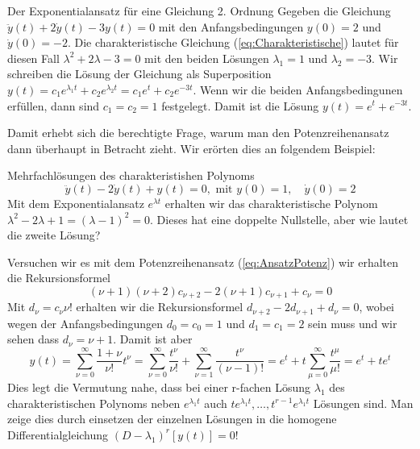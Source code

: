 \begin{example}{Der Exponentialansatz für eine Gleichung 2. Ordnung}
  Gegeben die Gleichung $\ddot{y}(t)+2\dot{y}(t)-3y(t)=0$ mit den
  Anfangsbedingungen $y(0)=2$ und $\dot{y}(0)=-2$. Die charakteristische
  Gleichung (\ref{eq:Charakteristische}) lautet für diesen Fall
  $\lambda^2+2\lambda-3=0$ mit den beiden Lösungen $\lambda_1=1$ und
  $\lambda_2=-3$. Wir schreiben die Lösung der Gleichung als Superposition
  $y(t)=c_1e^{\lambda_1 t}+c_2e^{\lambda_2 t}=c_1e^{t}+c_2e^{-3 t}$. Wenn wir
  die beiden Anfangsbedingunen erfüllen, dann sind $c_1=c_2=1$ festgelegt.
  Damit ist die Lösung $y(t)=e^t+e^{-3t}$.
\end{example}
Damit erhebt sich die berechtigte Frage, warum man den Potenzreihenansatz dann
überhaupt in Betracht zieht. Wir erörten dies an folgendem Beispiel:
\begin{example}{Mehrfachlösungen des charakteristishen Polynoms}
  \[\ddot{y}(t)-2\dot{y}(t)+y(t)=0,\mbox{ mit } y(0)=1,\quad \dot{y}(0)=2\]
Mit dem Exponentialansatz $e^{\lambda t}$ erhalten wir das charakteristische
Polynom $\lambda^2-2\lambda+1=(\lambda -1)^2=0$. Dieses hat eine
doppelte Nullstelle, aber wie lautet die zweite Lösung?
\end{example}
Versuchen wir es mit dem Potenzreihenansatz (\ref{eq:AnsatzPotenz}) wir
erhalten die Rekursionsformel
\[ (\nu+1)(\nu+2)c_{\nu+2}-2(\nu+1)c_{\nu+1}+c_\nu=0\]
Mit $d_\nu=c_{\nu}\nu!$ erhalten wir die Rekursionsformel
$d_{\nu+2}-2d_{\nu+1}+d_\nu=0$, wobei wegen der Anfangsbedingungen $d_0=c_0=1$
und $d_1=c_1=2$ sein muss und wir sehen dass $d_\nu=\nu+1$. Damit ist aber
\[ 
  y(t)=\sum\limits_{\nu=0}^{\infty}\frac{1+\nu}{\nu!}t^\nu=
        \sum\limits_{\nu=0}^{\infty}\frac{t^\nu}{\nu!}
       +\sum\limits_{\nu=1}^{\infty}\frac{t^\nu}{(\nu-1)!}=
        e^t+t\sum\limits_{\mu=0}^{\infty}\frac{t^\mu}{\mu!}=e^t+te^t
\]       
Dies legt die Vermutung nahe, dass bei einer r-fachen Lösung $\lambda_1$ des
charakteristischen Polynoms neben $e^{\lambda_1 t}$ auch $te^{\lambda_1
t},\dots,t^{r-1}e^{\lambda_1 t}$ Lösungen sind. Man zeige dies durch einsetzen
der einzelnen Lösungen in die homogene Differentialgleichung
$(D-\lambda_1)^r[y(t)]=0$!
%
